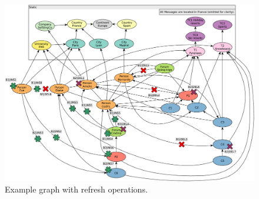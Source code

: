 \begin{figure}[ht]
    \centering
    \includegraphics[scale=\yedscale]{figures/example-graph-with-refreshes}
    \caption{Example graph with refresh operations.}
    \label{fig:example-graph-with-refreshes}
\end{figure}
